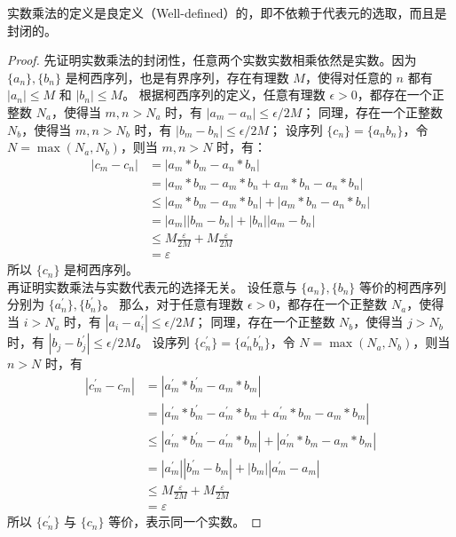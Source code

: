 \begin{proposition}
    实数乘法的定义是良定义（Well-defined）的，即不依赖于代表元的选取，而且是封闭的。
\end{proposition}

\begin{proof}
    先证明实数乘法的封闭性，任意两个实数实数相乘依然是实数。因为 $\{a_n\},\{b_n\}$ 是柯西序列，也是有界序列，存在有理数 $M$，使得对任意的 $n$ 都有 $|a_n|\le M$ 和 $|b_n|\le M$。
    根据柯西序列的定义，任意有理数 $\epsilon>0$，都存在一个正整数 $N_a$，使得当 $m,n>N_a$ 时，有 $|a_m - a_n| \le \epsilon/2M$；
    同理，存在一个正整数 $N_b$，使得当 $m,n>N_b$ 时，有 $|b_m - b_n| \le \epsilon/2M$；
    设序列 $\{c_n\}=\{a_nb_n\}$，令 $N=\max(N_a,N_b)$，则当 $m,n>N$ 时，有：
    \begin{align*}
        |c_m-c_n| &= |a_m*b_m-a_n*b_n| \\
        &=|a_m*b_m - a_m*b_n + a_m*b_n-a_n*b_n|\\
        &\le |a_m*b_m - a_m*b_n| + |a_m*b_n-a_n*b_n|\\
        &= |a_m| |b_m-b_n|+|b_n||a_m-b_n|\\
        &\le M \frac{\varepsilon}{2M} + M\frac{\varepsilon}{2M}\\
        &= \varepsilon
    \end{align*}
    所以 $\{c_n\}$ 是柯西序列。\\
    再证明实数乘法与实数代表元的选择无关。
    设任意与 $\{a_n\},\{b_n\}$ 等价的柯西序列分别为 $\{a_n^{\prime}\},\{b_n^{\prime}\}$。
    那么，对于任意有理数 $\epsilon>0$，都存在一个正整数 $N_a$，使得当 $i>N_a$ 时，有 $|a_i - a_i^{\prime}| \le \epsilon/2M$；
    同理，存在一个正整数 $N_b$，使得当 $j>N_b$ 时，有 $|b_j - b_j^{\prime}| \le \epsilon/2M$。
    设序列 $\{c_n^{\prime}\}=\{a_n^{\prime}b_n^{\prime}\}$，令 $N=\max(N_a,N_b)$，则当 $n>N$ 时，有
    \begin{align*}
        |c_m^{\prime}-c_m| &= |a^{\prime}_m*b^{\prime}_m - a_m*b_m|\\
        & =|a^{\prime}_m*b^{\prime}_m - a^{\prime}_m*b_m + a^{\prime}_m*b_m - a_m*b_m|\\
        &\le |a^{\prime}_m*b^{\prime}_m - a^{\prime}_m*b_m|+|a^{\prime}_m*b_m - a_m*b_m|\\
        &= |a^{\prime}_m||b^{\prime}_m-b_m| + |b_m||a^{\prime}_m-a_m|\\
        & \le M \frac{\varepsilon}{2M} + M \frac{\varepsilon}{2M}\\
        &= \varepsilon
    \end{align*}
    所以 $\{c_n^{\prime}\}$ 与 $\{c_n\}$ 等价，表示同一个实数。
\end{proof}

